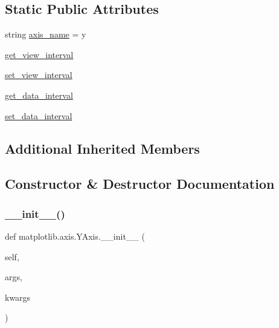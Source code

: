 \subsection*{Static Public Attributes}
\begin{DoxyCompactItemize}
\item 
string \hyperlink{classmatplotlib_1_1axis_1_1YAxis_a6d38e555a714ed3a7f0c135163e2b72b}{axis\+\_\+name} = \textquotesingle{}y\textquotesingle{}
\item 
\hyperlink{classmatplotlib_1_1axis_1_1YAxis_a922a74d86a08a22458f813653254cb09}{get\+\_\+view\+\_\+interval}
\item 
\hyperlink{classmatplotlib_1_1axis_1_1YAxis_aaed137642421c32ebf40681f1ad609b5}{set\+\_\+view\+\_\+interval}
\item 
\hyperlink{classmatplotlib_1_1axis_1_1YAxis_ab7995f14e4688ef75a5006a2e1f41c0b}{get\+\_\+data\+\_\+interval}
\item 
\hyperlink{classmatplotlib_1_1axis_1_1YAxis_a2ef9a84c6d6baee9544ac4fc656c6beb}{set\+\_\+data\+\_\+interval}
\end{DoxyCompactItemize}
\subsection*{Additional Inherited Members}


\subsection{Constructor \& Destructor Documentation}
\mbox{\label{classmatplotlib_1_1axis_1_1YAxis_a32a7d30f2dc7d7ea0dbe7cdf883e7915}} 
\subsubsection{\texorpdfstring{\+\_\+\+\_\+init\+\_\+\+\_\+()}{\_\_init\_\_()}}
{\footnotesize\ttfamily def matplotlib.\+axis.\+Y\+Axis.\+\_\+\+\_\+init\+\_\+\+\_\+ (\begin{DoxyParamCaption}\item[{}]{self,  }\item[{}]{args,  }\item[{}]{kwargs }\end{DoxyParamCaption})}



